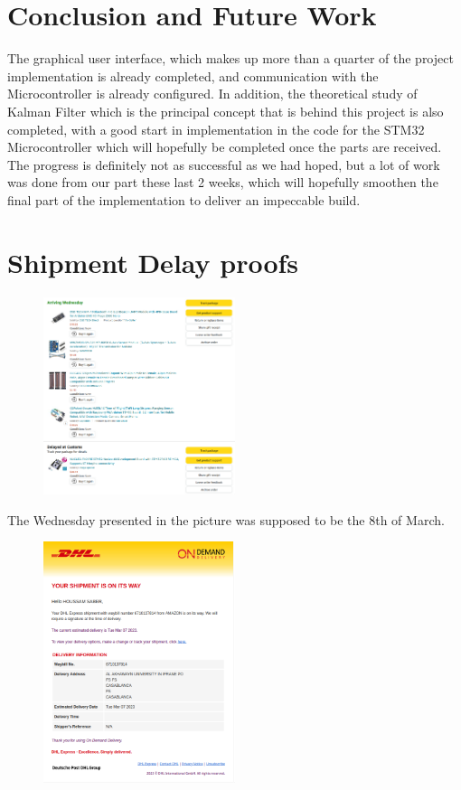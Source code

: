 \documentclass[12pt]{article}
\numberwithin{equation}{section}
\begin{document}
\section{Conclusion and Future Work}
    The graphical user interface, which makes up more than a quarter of the project implementation is already completed, and communication with the Microcontroller is already configured. In addition, the theoretical study of Kalman Filter which is the principal concept that is behind this project is also completed, with a good start in implementation in the code for the STM32 Microcontroller which will hopefully be completed once the parts are received. 
    The progress is definitely not as successful as we had hoped, but a lot of work was done from our part these last 2 weeks, which will hopefully smoothen the final part of the implementation to deliver an impeccable build.


   \newpage
    \appendix

    \section{Shipment Delay proofs}
    \begin{figure}[H]
      \centering
      \includegraphics[width=0.5\textwidth]{Figures/Amazon.png}
    \end{figure}
    The Wednesday presented in the picture was supposed to be the 8th of March.
    \begin{figure}[H]
      \centering
      \includegraphics[width=0.5\textwidth]{Figures/DHL.png}
    \end{figure}





  \pagebreak


\nocite{*}
\end{document}
